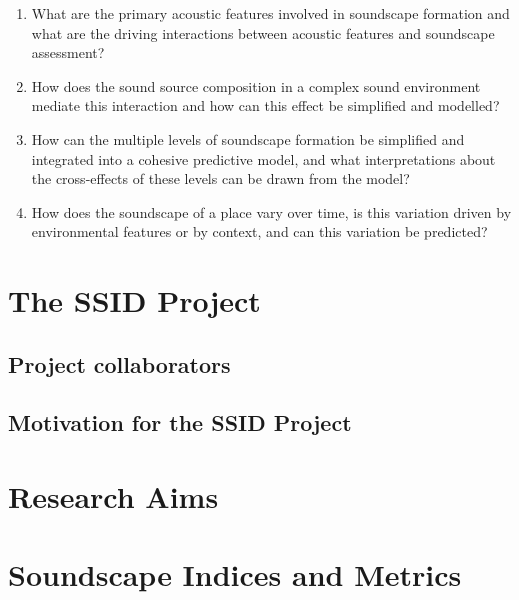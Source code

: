   \begin{enumerate}
      \item What are the primary acoustic features involved in soundscape formation and what are the driving interactions between acoustic features and soundscape assessment?
      \item How does the sound source composition in a complex sound environment mediate this interaction and how can this effect be simplified and modelled?
      \item How can the multiple levels of soundscape formation be simplified and integrated into a cohesive predictive model, and what interpretations about the cross-effects of these levels can be drawn from the model?
      \item How does the soundscape of a place vary over time, is this variation driven by environmental features or by context, and can this variation be predicted?
  \end{enumerate}

\section{The SSID Project}

  \subsection{Project collaborators}

  \subsection{Motivation for the SSID Project}

\section{Research Aims}

\section{Soundscape Indices and Metrics}

